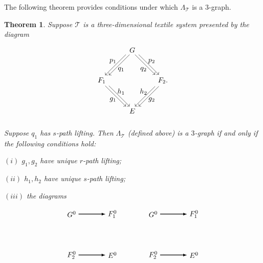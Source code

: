\documentclass[a4paper,reqno,12pt]{amsart}
\newtheorem{thm}{Theorem}[section]
\theoremstyle{definition}
\theoremstyle{remark}
\begin{document}
The following theorem provides conditions under which $\Lambda_{\mathcal{T}}$ is a $3$-graph.

\begin{thm}\label{th 3D textile to 3-graph}
Suppose $\mathcal{T}$ is a three-dimensional textile system presented by the diagram 
\[
\begin{tikzpicture}[scale=1]
\node[inner sep=2.5pt, circle] (B) at (-1.5,0) {$F_1$};
\node[inner sep=2.5pt, circle] (C) at (1.5,0) {$F_2$.};	
\node[inner sep=2.5pt, circle] (D) at (0,-1.5) {$E$};
\node[inner sep=2.5pt, circle] (A) at (0,1.5) {$G$}; 

\draw[transform canvas={xshift=0.6ex}, ->] (A) -- (B);
\draw[transform canvas={xshift=-0.6ex}, ->] (A) -- (B);

\draw[transform canvas={xshift=0.6ex}, ->] (A) -- (C);
\draw[transform canvas={xshift=-0.6ex}, ->] (A) -- (C);

\draw[transform canvas={xshift=0.6ex}, ->] (C) -- (D);
\draw[transform canvas={xshift=-0.6ex}, ->] (C) -- (D);

\draw[transform canvas={xshift=0.6ex}, ->] (B) -- (D);
\draw[transform canvas={xshift=-0.6ex}, ->] (B) -- (D);

\node at (-0.55,0.55) {$q_1$};
\node at (-0.95,0.95) {$p_1$};

\node at (0.55,0.55) {$q_2$};
\node at (0.95,0.95) {$p_2$};

\node at (-0.55,-0.55) {$h_1$};
\node at (-0.95,-0.95) {$g_1$};

\node at (0.55,-0.55) {$h_2$};
\node at (0.95,-0.95) {$g_2$};
\end{tikzpicture}
\]

Suppose $q_1$ has $s$-path lifting. Then $\Lambda_{\mathcal{T}}$ (defined above) is a $3$-graph if and only if the following conditions hold:

$(i)$ $g_1,g_2$ have unique $r$-path lifting;

$(ii)$ $h_1,h_2$ have unique $s$-path lifting;

$(iii)$ the diagrams 

\[
\begin{tikzpicture}[scale=1]
\node[] (A1) at (0,0) {$G^0$};
\node[] (A2) at (2,0) {$F_1^0$};
\node[] (A3) at (4,0) {$G^0$};
\node[] (A4) at (6,0) {$F_1^0$};

\node[] (B1) at (0,-2) {$F_2^0$};
\node[] (B2) at (2,-2) {$E^0$};
\node[] (B3) at (4,-2) {$F_2^0$};
\node[] (B4) at (6,-2) {$E^0$};


\path[->, >=latex,thick] (A1) edge [] node[]{} (A2);
\path[->, >=latex,thick] (B1) edge [] node[]{} (B2);
\path[->, >=latex,thick] (A3) edge [] node[]{} (A4);
\path[->, >=latex,thick] (B3) edge [] node[]{} (B4);


\end{tikzpicture}\]
\end{thm}
\end{document}
